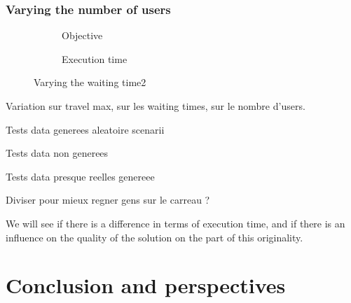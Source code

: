 \documentclass[12pt, a4paper,twoside]{memoir}
\begin{document}
	\subsection{Varying the number of users}
	
	\begin{figure}[H]
		\centering
		\begin{subfigure}{.5\textwidth}
			\centering
			\caption{Objective}
		\end{subfigure}%
		\begin{subfigure}{.5\textwidth}
			\centering
			\caption{Execution time}
		\end{subfigure}
		\caption{Varying the waiting time2}
		\label{fig:var users}
	\end{figure}
	
	
	Variation sur travel max, sur les waiting times, sur le nombre d'users.
	
	Tests data generees aleatoire scenarii
	
	Tests data non generees
	
	Tests data presque reelles genereee
	
	Diviser pour mieux regner gens sur le carreau ? 
	
	We will see if there is a difference in terms of execution time, and if there is an influence on the quality of the solution on the part of this originality.

	\cleardoublepage
	\chapter*{Conclusion and perspectives}
	
\end{document}

